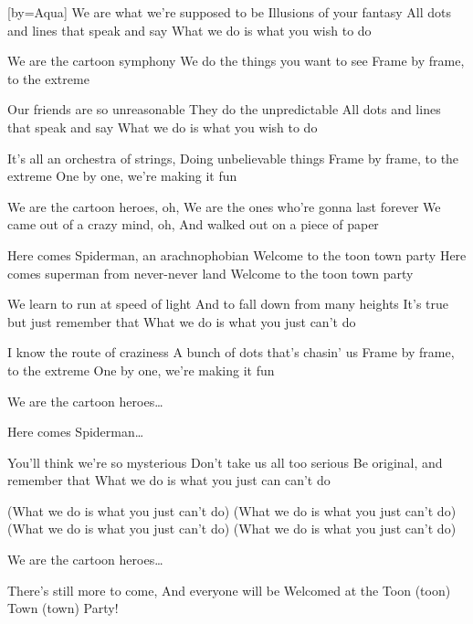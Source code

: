 [by={Aqua}]
\beginverse
We are what we're supposed to be 
Illusions of your fantasy 
All dots and lines that speak and say 
What we do is what you wish to do 
\endverse

\beginverse
We are the cartoon symphony 
We do the things you want to see 
Frame by frame, to the extreme 
\endverse 

\beginverse
Our friends are so unreasonable 
They do the unpredictable 
All dots and lines that speak and say 
What we do is what you wish to do
\endverse 

\beginverse
It's all an orchestra of strings, 
Doing unbelievable things 
Frame by frame, to the extreme 
One by one, we're making it fun
\endverse 

\beginchorus
We are the cartoon heroes, oh,
We are the ones who're gonna last forever 
We came out of a crazy mind, oh,
And walked out on a piece of paper 
\endchorus

\beginchorus 
Here comes Spiderman, an arachnophobian 
Welcome to the toon town party 
Here comes superman from never-never land 
Welcome to the toon town party
\endchorus
 
\beginverse
We learn to run at speed of light 
And to fall down from many heights 
It's true but just remember that 
What we do is what you just can't do 
\endverse

\beginverse 
I know the route of craziness 
A bunch of dots that's chasin' us 
Frame by frame, to the extreme 
One by one, we're making it fun 
\endverse

\beginchorus
We are the cartoon heroes\dots
\endchorus

\beginchorus 
Here comes Spiderman\dots
\endchorus

\beginverse
You'll think we're so mysterious 
Don't take us all too serious 
Be original, and remember that 
What we do is what you just can can't do  
\endverse

\beginverse 
(What we do is what you just can't do)
(What we do is what you just can't do) 
(What we do is what you just can't do) 
(What we do is what you just can't do)
\endverse

\beginchorus
We are the cartoon heroes\dots
\endchorus

\beginverse 
There's still more to come, 
And everyone will be 
Welcomed at the 
Toon (toon) 
Town (town) 
Party!
\endverse
\endsong

